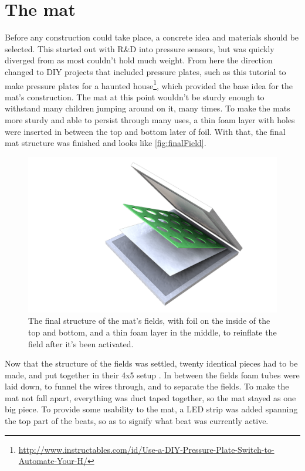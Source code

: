 \section{The mat}%
	Before any construction could take place, a concrete idea and materials should be selected. This started out with R\&D into pressure sensors, but was quickly diverged from as most couldn't hold much weight. From here the direction changed to DIY projects that included pressure plates, such as this tutorial to make pressure plates for a haunted house\footnote{\url{http://www.instructables.com/id/Use-a-DIY-Pressure-Plate-Switch-to-Automate-Your-H/}}, which provided the base idea for the mat's construction. The mat at this point wouldn't be sturdy enough to withstand many children jumping around on it, many times. To make the mats more sturdy and able to persist through many uses, a thin foam layer with holes were inserted in between the top and bottom later of foil. With that, the final mat structure was finished and looks like \autoref{fig:finalField}.\\
	
	\begin{figure}[H]
		\centering
		\includegraphics[width=0.7\linewidth]{figure/Implementation/Medialogyp4mat}
		\caption{The final structure of the mat's fields, with foil on the inside of the top and bottom, and a thin foam layer in the middle, to reinflate the field after it's been activated.}
		\label{fig:finalField}
	\end{figure}
	Now that the structure of the fields was settled, twenty identical pieces had to be made, and put together in their 4x5 setup . In between the fields foam tubes were laid down, to funnel the wires through, and to separate the fields. To make the mat not fall apart, everything was duct taped together, so the mat stayed as one big piece. To provide some usability to the mat, a LED strip was added spanning the top part of the beats, so as to signify what beat was currently active.
	
